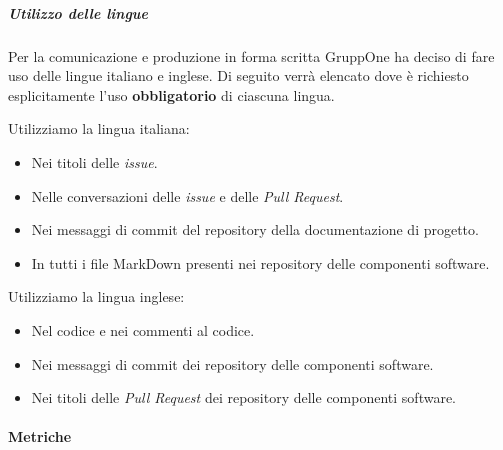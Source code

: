 \documentclass[../../norme-di-progetto.tex]{subfiles}
\begin{document}
\subparagraph{Utilizzo delle lingue}%
\label{subp:utilizzo_delle_lingue}

Per la comunicazione e produzione in forma scritta GruppOne ha deciso di fare uso delle lingue italiano e inglese.
Di seguito verrà elencato dove è richiesto esplicitamente l'uso \textbf{obbligatorio} di ciascuna lingua.

Utilizziamo la lingua italiana:
\begin{itemize}
  \item Nei titoli delle \textit{issue}.
  \item Nelle conversazioni delle \textit{issue} e delle \textit{Pull Request}.
  \item Nei messaggi di commit del repository della documentazione di progetto.
  \item In tutti i file MarkDown presenti nei repository delle componenti software.
\end{itemize}

Utilizziamo la lingua inglese:
\begin{itemize}
  \item Nel codice e nei commenti al codice.
  \item Nei messaggi di commit dei repository delle componenti software.
  \item Nei titoli delle \textit{Pull Request} dei repository delle componenti software.
\end{itemize}


\paragraph{Metriche}%
\label{par:metriche}
\end{document}
